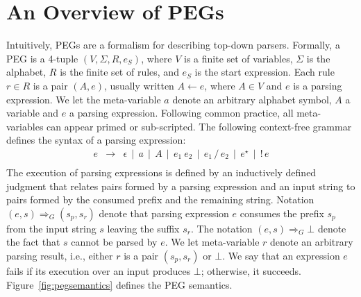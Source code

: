 \section{An Overview of PEGs}\label{sec:pegs}

Intuitively, PEGs are a formalism for describing top-down parsers.
Formally, a PEG is a 4-tuple \((V,\Sigma,R,e_S)\), where \(V\) is a 
finite set of variables, \(\Sigma\) is the alphabet, \(R\) is the finite 
set of rules, and \(e_S\) is the start expression. Each rule \(r \in R\) is a 
pair \((A,e)\), usually written \(A \leftarrow e\), where \(A \in V\) and \(e\) 
is a parsing expression. We let the meta-variable \(a\) denote an 
arbitrary alphabet symbol, \(A\) a variable and \(e\) a parsing expression. 
Following common practice, all meta-variables can appear primed or 
sub-scripted. The following context-free grammar defines
the syntax of a parsing expression:
\[
   \begin{array}{lcl}
      e & \to & \epsilon \, \mid \, a \, \mid \, A\, \mid \,e_1\:e_2\,
                  \mid\,e_1\,/\,e_2\, \mid \,e^\star\, \mid \,!\,e \\
   \end{array}
\]
The execution of parsing expressions is defined by an inductively defined
judgment that relates pairs formed by a parsing expression and an input string
to pairs formed by the consumed prefix and the remaining string.
Notation \((e,s) \Rightarrow_G (s_p,s_r)\) denote that parsing expression \(e\)
consumes the prefix \(s_p\) from the input string \(s\) leaving the suffix \(s_r\).
The notation \((e,s) \Rightarrow_G \bot\) denote the fact that \(s\) cannot be 
parsed by \(e\). We let meta-variable \(r\) denote an arbitrary parsing result, i.e.,
either \(r\) is a pair \((s_p,s_r)\) or \(\bot\). We say that an expression \(e\)
fails if its execution over an input produces \(\bot\); otherwise, it succeeds.
Figure~\ref{fig:pegsemantics} defines the PEG semantics.
